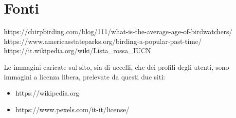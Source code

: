 \documentclass[12pt, a4paper]{article}
\begin{document}
    \section{Fonti}
    https://chirpbirding.com/blog/111/what-is-the-average-age-of-birdwatchers/
    https://www.americasstateparks.org/birding-a-popular-past-time/
    https://it.wikipedia.org/wiki/Lista_rossa_IUCN

    Le immagini caricate sul sito, sia di uccelli, che dei profili degli utenti, sono immagini a licenza libera, prelevate da questi due siti:
    \begin{itemize}
        \item https://wikipedia.org 
        \item https://www.pexels.com/it-it/license/    
    \end{itemize}
\end{document}
